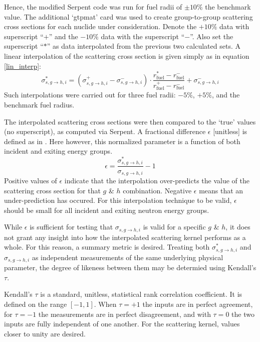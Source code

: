 \documentclass{physor2012}
\begin{document}
Hence, the modified Serpent code was run for fuel radii of $\pm 10\%$
the benchmark value. The additional `gtpmat' card was used to create 
group-to-group scattering cross sections for each nuclide under consideration.
Denote the $+10\%$ data with superscript ``$+$'' and the $-10\%$ data with the 
superscript ``$-$''.  Also set the superscript ``$*$'' as data interpolated
from the previous two calculated sets.  A linear interpolation of the 
scattering cross section is given simply as in equation \ref{lin_interp}:
\begin{equation}
\label{lin_interp}
\sigma_{s,g\to h,i}^{*} = \left(\sigma_{s,g\to h,i}^{+} - \sigma_{s,g\to h,i}^{-}\right)\cdot
                          \frac{r_{\mbox{fuel}}^{*} - r_{\mbox{fuel}}^{-}}
                               {r_{\mbox{fuel}}^{+} - r_{\mbox{fuel}}^{-}} + 
                          \sigma_{s,g\to h,i}^{-}
\end{equation}
Such interpolations were carried out for three fuel radii: $-5\%$, $+5\%$, and the 
benchmark fuel radius.

The interpolated scattering cross sections were then compared to the `true'
values (no superscript), as computed via Serpent. A fractional difference 
$\epsilon$ [unitless] is defined as in \cite{}.  Here however, this normalized 
parameter is a function of both incident and exiting energy groups.
\begin{equation}
\label{epsilon_def}
\epsilon = \frac{\sigma_{s,g\to h,i}^{*}}{\sigma_{s,g\to h,i}} - 1
\end{equation}
Positive values of $\epsilon$ indicate that the interpolation over-predicts
the value of the scattering cross section for that $g$ \& $h$ combination.
Negative $\epsilon$ means that an under-prediction has occured.  For this
interpolation technique to be valid, $\epsilon$ should be small for all
incident and exiting neutron energy groups.

While $\epsilon$ is sufficient for testing that $\sigma_{s,g\to h,i}$ is 
valid for a specific $g$ \& $h$, it does not grant any insight into how the 
interpolated scattering kernel performs as a whole.  For this reason, a summary 
metric is desired.  Treating both $\sigma_{s,g\to h,i}^{*}$ and $\sigma_{s,g\to h,i}$ 
as independent measurements of the same underlying physical parameter, the degree of 
likeness between them may be determied using Kendall's $\tau$.

Kendall's $\tau$ is a standard, unitless, statistical rank correlation coefficient.
It is defined on the range $[-1,1]$.  When $\tau=+1$ the inputs are in perfect agreement,
for $\tau=-1$ the measurements are in perfect disagreement, and with $\tau=0$ the 
two inputs are fully independent of one another.  For the scattering kernel, 
values closer to unity are desired.
\end{document}
